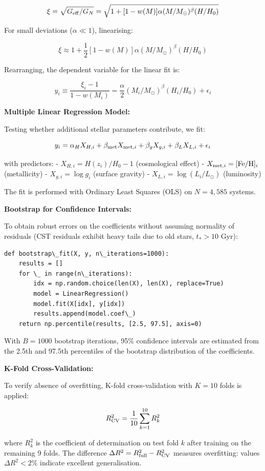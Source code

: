 \documentclass[11pt,a4paper]{article}
\begin{document}
\[\xi = \sqrt{G_{\rm eff}/G_N} = \sqrt{1 + [1-w(M)]\alpha(M/M_\odot)^\beta (H/H_0)}\]

For small deviations (\(\alpha \ll 1\)), linearising:

\[\xi \approx 1 + \frac{1}{2}[1-w(M)]\alpha(M/M_\odot)^\beta (H/H_0)\]

Rearranging, the dependent variable for the linear fit is:

\[y_i \equiv \frac{\xi_i - 1}{1-w(M_i)} = \frac{\alpha}{2}(M_i/M_\odot)^\beta (H_i/H_0) + \epsilon_i\]

\textbf{Multiple Linear Regression Model:}

Testing whether additional stellar parameters contribute, we fit:

\[y_i = \alpha_H X_{H,i} + \beta_{\rm met} X_{{\rm met},i} + \beta_g X_{g,i} + \beta_L X_{L,i} + \epsilon_i\]

with predictors: - \(X_{H,i} = H(z_i)/H_0 - 1\) (cosmological effect) -
\(X_{{\rm met},i} = [{\rm Fe/H}]_i\) (metallicity) -
\(X_{g,i} = \log g_i\) (surface gravity) -
\(X_{L,i} = \log(L_i/L_\odot)\) (luminosity)

The fit is performed with Ordinary Least Squares (OLS) on \(N = 4,585\)
systems.

\textbf{Bootstrap for Confidence Intervals:}

To obtain robust errors on the coefficients without assuming normality
of residuals (CST residuals exhibit heavy tails due to old stars,
\(t_* > 10\) Gyr):

\begin{lstlisting}
def bootstrap\_fit(X, y, n\_iterations=1000):
    results = []
    for \_ in range(n\_iterations):
        idx = np.random.choice(len(X), len(X), replace=True)
        model = LinearRegression()
        model.fit(X[idx], y[idx])
        results.append(model.coef\_)
    return np.percentile(results, [2.5, 97.5], axis=0)
\end{lstlisting}

With \(B = 1000\) bootstrap iterations, 95\% confidence intervals are
estimated from the 2.5th and 97.5th percentiles of the bootstrap
distribution of the coefficients.

\textbf{K-Fold Cross-Validation:}

To verify absence of overfitting, K-fold cross-validation with
\(K = 10\) folds is applied:

\[R^2_{\rm CV} = \frac{1}{10}\sum_{k=1}^{10} R^2_k\]

where \(R^2_k\) is the coefficient of determination on test fold \(k\)
after training on the remaining 9 folds. The difference
\(\Delta R^2 = R^2_{\rm full} - R^2_{\rm CV}\) measures overfitting:
values \(\Delta R^2 < 2\%\) indicate excellent generalisation.
\end{document}
